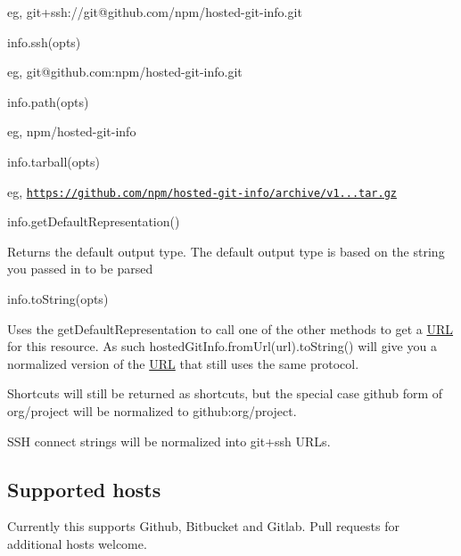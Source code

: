 eg, {\ttfamily git+ssh\+://git@github.\+com/npm/hosted-\/git-\/info.git}


\begin{DoxyItemize}
\item info.\+ssh(opts)
\end{DoxyItemize}

eg, {\ttfamily git@github.\+com\+:npm/hosted-\/git-\/info.\+git}


\begin{DoxyItemize}
\item info.\+path(opts)
\end{DoxyItemize}

eg, {\ttfamily npm/hosted-\/git-\/info}


\begin{DoxyItemize}
\item info.\+tarball(opts)
\end{DoxyItemize}

eg, {\ttfamily \href{https://github.com/npm/hosted-git-info/archive/v1.2.0.tar.gz}{\tt https\+://github.\+com/npm/hosted-\/git-\/info/archive/v1...\+tar.\+gz}}


\begin{DoxyItemize}
\item info.\+get\+Default\+Representation()
\end{DoxyItemize}

Returns the default output type. The default output type is based on the string you passed in to be parsed


\begin{DoxyItemize}
\item info.\+to\+String(opts)
\end{DoxyItemize}

Uses the get\+Default\+Representation to call one of the other methods to get a \mbox{\hyperlink{namespace_u_r_l}{U\+RL}} for this resource. As such {\ttfamily hosted\+Git\+Info.\+from\+Url(url).to\+String()} will give you a normalized version of the \mbox{\hyperlink{namespace_u_r_l}{U\+RL}} that still uses the same protocol.

Shortcuts will still be returned as shortcuts, but the special case github form of {\ttfamily org/project} will be normalized to {\ttfamily github\+:org/project}.

S\+SH connect strings will be normalized into {\ttfamily git+ssh} U\+R\+Ls.

\subsection*{Supported hosts}

Currently this supports Github, Bitbucket and Gitlab. Pull requests for additional hosts welcome. 